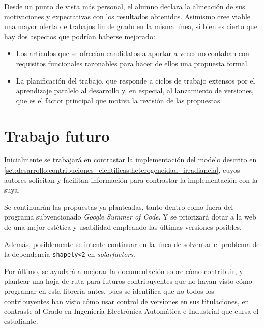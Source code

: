 Desde un punto de vista más personal, el alumno declara la alineación de sus motivaciones y expectativas con los resultados obtenidos. Asimismo cree viable una mayor oferta de trabajos fin de grado en la misma línea, si bien es cierto que hay dos aspectos que podrían haberse mejorado:

\begin{itemize}
    \item Los artículos que se ofrecían candidatos a aportar a veces no contaban con requisitos funcionales razonables para hacer de ellos una propuesta formal.
    \item La planificación del trabajo, que responde a ciclos de trabajo extensos por el aprendizaje paralelo al desarrollo y, en especial, al lanzamiento de versiones, que es el factor principal que motiva la revisión de las propuestas.
\end{itemize}


\section{Trabajo futuro} \label{sct:resultados:trabajofuturo}

Inicialmente se trabajará en contrastar la implementación del modelo descrito en \ref{sct:desarrollo:contribuciones_cientificas:heterogeneidad_irradiancia}, cuyos autores solicitan y facilitan información para contrastar la implementación con la suya.

Se continuarán las propuestas ya planteadas, tanto dentro como fuera del programa subvencionado \textit{Google Summer of Code}. Y se priorizará dotar a la web de una mejor estética y usabilidad empleando las últimas versiones posibles.

Además, posiblemente se intente continuar en la línea de solventar el problema de la dependencia \texttt{shapely<2} en \textit{solarfactors}.

Por último, se ayudará a mejorar la documentación sobre cómo contribuir, y plantear una hoja de ruta para futuros contribuyentes que no hayan visto cómo programar en esta librería antes, pues se identifica que no todos los contribuyentes han visto cómo usar control de versiones en sus titulaciones, en contraste al Grado en Ingeniería Electrónica Automática e Industrial que cursa el estudiante.
